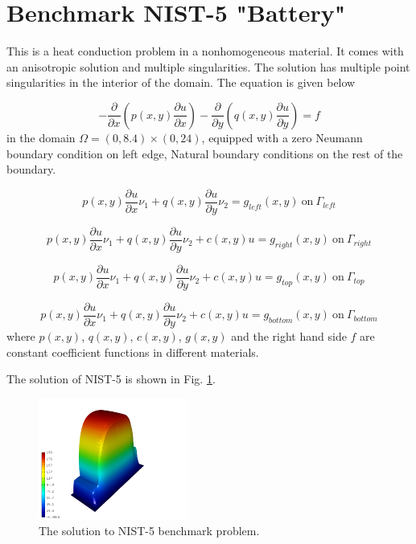 \section{Benchmark NIST-5 "Battery"}
\label{sec:bench-5}

This is a heat conduction problem in a nonhomogeneous material. It comes with an anisotropic solution and
multiple singularities. The solution has multiple point singularities in the interior of the domain.
The equation is given below

\begin{equation} \label{heat-conduction}
-\frac{\partial }{\partial x}\left(p(x, y)\frac{\partial u}{\partial x}\right)
-\frac{\partial }{\partial y}\left(q(x, y)\frac{\partial u}{\partial y}\right) = f
\end{equation}
in the domain $\Omega = (0, 8.4) \times (0, 24)$, equipped with
a zero Neumann boundary condition on left edge, Natural boundary conditions on the rest of the boundary.

\begin{equation}
p(x, y)\frac{\partial u}{\partial x}\nu_1 + q(x, y)\frac{\partial u}{\partial y}\nu_2 = g_{left}(x, y) \ \mbox{on} \  \Gamma_{left}
\end{equation}

\begin{equation}
p(x, y)\frac{\partial u}{\partial x}\nu_1 + q(x, y)\frac{\partial u}{\partial y}\nu_2 + c(x, y)u = g_{right}(x, y) \ \mbox{on} \ \Gamma_{right}
\end{equation}

\begin{equation}
p(x, y)\frac{\partial u}{\partial x}\nu_1 + q(x, y)\frac{\partial u}{\partial y}\nu_2 + c(x, y)u = g_{top}(x, y) \ \mbox{on} \ \Gamma_{top}
\end{equation}

\begin{equation}
p(x, y)\frac{\partial u}{\partial x}\nu_1 + q(x, y)\frac{\partial u}{\partial y}\nu_2 + c(x, y)u = g_{bottom}(x, y) \ \mbox{on} \ \Gamma_{bottom}
\end{equation}
where $p(x, y)$, $q(x, y)$, $c(x, y)$, $g(x, y)$
and the right hand side $f$ are constant coefficient
functions in different materials.

The solution of NIST-5 is shown in Fig. \ref{fig:sln-nist05}.
\begin{figure}[!ht]
\centering
\includegraphics[height=40mm]{nist/nist-5/solution-3d.png}
\caption{The solution to NIST-5 benchmark problem.}
\label{fig:sln-nist05}
\end{figure}
